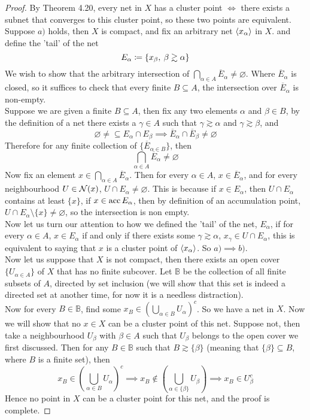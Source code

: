 \documentclass[../../main.tex]{subfiles}
\begin{document}
\begin{proof}
By Theorem 4.20, every net in $X$ has a cluster point $\iff$ there exists a subnet that converges to this cluster point, so these two points are equivalent. \\

Suppose $a)$ holds, then $X$ is compact, and fix an arbitrary net $\langle {x_\alpha} \rangle$ in $X$. and define the 'tail' of the net 
\[
E_\alpha\coloneqq\{x_\beta,\:\beta\gtrsim\alpha\}
\]
We wish to show that the arbitrary intersection of $\bigcap_{\alpha\in A}\overline{E}_\alpha\neq\varnothing$. Where $\overline{E}_\alpha$ is closed, so it suffices to check that every finite $B\subseteq A$, the intersection over $\overline{E}_\alpha$ is non-empty.\\

Suppose we are given a finite $B\subseteq A$, then fix any two elements $\alpha$ and $\beta\in B$, by the definition of a net there exists a $\gamma\in A$ such that $\gamma\gtrsim\alpha$ and $\gamma\gtrsim\beta$, and
\[
\varnothing\neq\subseteq E_\alpha\cap E_\beta\implies \overline{E}_\alpha\cap\overline{E}_\beta\neq\varnothing
\]
Therefore for any finite collection of $\{\overline{E}_{\alpha\in B}\}$, then 
\[
\bigcap_{\alpha\in A}\overline{E}_\alpha\neq\varnothing
\]
Now fix an element $x\in \bigcap_{\alpha\in A}\overline{E}_\alpha$. Then for every $\alpha\in A$, $x\in \overline{E}_\alpha$, and for every neighbourhood $U\in\mathcal{N}({x})$, $U\cap E_\alpha\neq\varnothing$. This is because if $x\in E_\alpha$, then $U\cap E_\alpha$ contains at least $\{x\}$, if $x\in\operatorname{acc}{E_\alpha}$, then by definition of an accumulation point, $U\cap E_\alpha\setminus\{x\}\neq\varnothing$, so the intersection is non empty.\\

Now let us turn our attention to how we defined the 'tail' of the net, $E_\alpha$, if for every $\alpha\in A$, $x\in E_\alpha$ if and only if there exists some $\gamma\gtrsim\alpha$, $x_\gamma\in U\cap E_\alpha$, this is equivalent to saying that $x$ is a cluster point of $\langle {x_\alpha} \rangle$. So $a)\implies b)$.\\

Now let us suppose that $X$ is not compact, then there exists an open cover $\{U_{\alpha\in A}\}$ of $X$ that has no finite subcover. Let $\mathbb{B}$ be the collection of all finite subsets of $A$, directed by set inclusion (we will show that this set is indeed a directed set at another time, for now it is a needless distraction).\\

Now for every $B\in\mathbb{B}$, find some $x_B\in \left(\bigcup_{\alpha\in B} U_\alpha\right)^c$. So we have a net in $X$. Now we will show that no $x\in X$ can be a cluster point of this net. Suppose not, then take a neighbourhood $U_\beta$ with $\beta\in A$ such that $U_\beta$ belongs to the open cover we first discussed. Then for any $B\in \mathbb{B}$ such that $B\gtrsim\{\beta\}$ (meaning that $\{\beta\}\subseteq B$, where $B$ is a finite set), then
\[
x_B\in\left(\bigcup_{\alpha\in B}U_\alpha\right)^c\implies x_B\notin\left(\bigcup_{\alpha\in \{\beta\}}U_\beta\right)\implies x_B\in U_\beta^c
\]
Hence no point in $X$ can be a cluster point for this net, and the proof is complete.
\end{proof}
\end{document}
